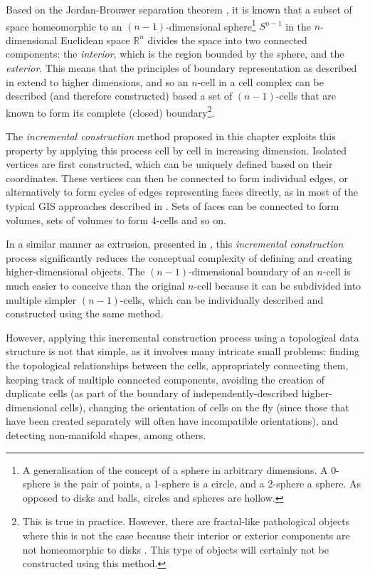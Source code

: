 Based on the Jordan-Brouwer separation theorem \citep{Lebesgue11,Brouwer11}, it is known that a subset of space homeomorphic to an $(n-1)$-dimensional sphere\footnote{A generalisation of the concept of a sphere in arbitrary dimensions.
A 0-sphere is the pair of points, a 1-sphere is a circle, and a 2-sphere a sphere. As opposed to disks and balls, circles and spheres are hollow.} $S^{n-1}$ in the $n$-dimensional Euclidean space $\mathbb{R}^n$ divides the space into two connected components: the \emph{interior}, which is the region bounded by the sphere, and the \emph{exterior}.
This means that the principles of boundary representation as described in  extend to higher dimensions, and so an $n$-cell in a cell complex can be described (and therefore constructed) based a set of $(n-1)$-cells that are known to form its complete (closed) boundary\footnote{This is true in practice.
However, there are fractal-like pathological objects where this is not the case because their interior or exterior components are not homeomorphic to disks \citep{Alexander24}.
This type of objects will certainly not be constructed using this method.}.

The \emph{incremental construction} method proposed in this chapter exploits this property by applying this process cell by cell in increasing dimension.
Isolated vertices are first constructed, which can be uniquely defined based on their coordinates.
These vertices can then be connected to form individual edges, or alternatively to form cycles of edges representing faces directly, as in most of the typical GIS approaches described in .
Sets of faces can be connected to form volumes, sets of volumes to form 4-cells and so on.

In a similar manner as extrusion, presented in , this \emph{incremental construction} process significantly reduces the conceptual complexity of defining and creating higher-dimensional objects.
The $(n-1)$-dimensional boundary of an $n$-cell is much easier to conceive than the original $n$-cell because it can be subdivided into multiple simpler $(n-1)$-cells, which can be individually described and constructed using the same method.

However, applying this incremental construction process using a topological data structure is not that simple, as it involves many intricate small problems: finding the topological relationships between the cells, appropriately connecting them, keeping track of multiple connected components, avoiding the creation of duplicate cells (as part of the boundary of independently-described higher-dimensional cells), changing the orientation of cells on the fly (since those that have been created separately will often have incompatible orientations), and detecting non-manifold shapes, among others.

